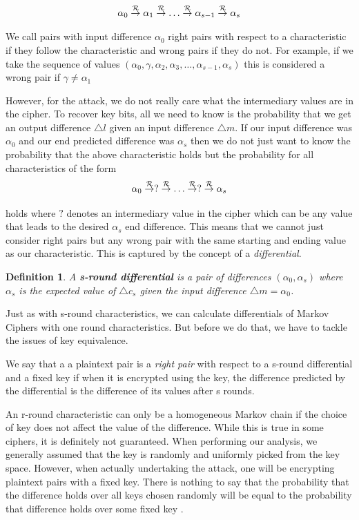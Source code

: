 \documentclass[12pt,a4paper]{article}
\newtheorem{definition}[theorem]{Definition}
\newcommand{\differ}[1] {\overset{#1}{\rightarrow}}
\begin{document}
\[\alpha_0 \differ{\cal{R}} \alpha_1 \differ{\cal{R}} \ldots \differ{\cal{R}} \alpha_{s-1}
\differ{\cal{R}} \alpha_s\]

We call pairs with input difference $\alpha_0$ right pairs with respect to a
characteristic if they follow the
characteristic and wrong pairs if they do not. For example, if we take the
sequence of values
$(\alpha_0,\gamma,\alpha_2,\alpha_3,\ldots,\alpha_{s-1},\alpha_s)$ this is
considered a wrong pair if $\gamma \neq \alpha_1$

However, for the attack, we do not really care what the intermediary values are
in the cipher. To recover key bits, all we need to know is the probability that
we get an output difference $\triangle l$ given an input difference $\triangle
m$. If our input
difference was $\alpha_0$ and our end predicted difference was $\alpha_s$ then
we do not just want to know the probability that the above characteristic holds
but the probability for all characteristics of the form
\[\alpha_0 \differ{\cal{R}} ? \differ{\cal{R}}  \ldots \differ{\cal{R}} ?
\differ{\cal{R}} \alpha_s\]

holds where $?$ denotes an intermediary value in the cipher which can be any value
that leads to the desired $\alpha_s$ end difference. This means that we cannot
just consider right pairs but any wrong pair with the same starting and ending
value as our characteristic. This is captured by the concept of a
\textit{differential}.

\begin{definition}
A \textbf{s-round differential} is a pair of differences $(\alpha_0,\alpha_s)$ where
$\alpha_s$ is the expected value of $\triangle c_s$ given the input difference
$\triangle m = \alpha_0$.
\end{definition}

Just as with s-round characteristics, we can calculate differentials of Markov
Ciphers with one round characteristics.  But
before we do that, we have to tackle the issues of key equivalence.

We say that a a plaintext pair is a \textit{right pair} with respect to a
s-round differential and a fixed key if when it is encrypted using the key, the
difference predicted by the differential is the difference of its values after
s rounds.

An r-round characteristic can only be a homogeneous Markov chain if the choice
of key does not affect the value of the difference. While this is true in some
ciphers, it is definitely not guaranteed. When performing our analysis, we
generally assumed that the key is randomly and uniformly picked from the
key space. However, when actually undertaking the attack, one will be encrypting
plaintext pairs with a fixed key. There is nothing to say that the probability
that the difference holds over all keys chosen randomly will be equal to the
probability that difference holds over some fixed key
 \cite{MarkovCiphers}.
\end{document}
